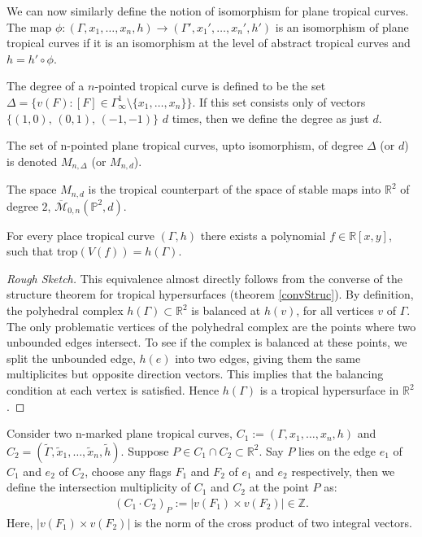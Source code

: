 We can now similarly define the notion of isomorphism for plane tropical curves. 
The map $\phi: (\Gamma, x_{1}, \dots, x_{n}, h) \to (\Gamma', x_{1}', \dots, x_{n}', h')$ is an isomorphism of plane tropical curves if it is an isomorphism at the level of abstract tropical curves and $h = h' \circ \phi$.

\begin{definition}
    The degree of a $n$-pointed tropical curve is defined to be the set $\Delta = \{v(F):[F] \in \Gamma^{1}_{\infty} \setminus \{x_{1}, \dots,x_{n} \} \}$.
    If this set consists only of vectors $\{(1,0),\,(0,1),\,(-1,-1)\}$ $d$ times, then we define the degree as just $d$.
    \par The set of n-pointed plane tropical curves, upto isomorphism, of degree $\Delta$ (or $d$) is denoted $M_{n, \Delta}$ (or $M_{n,d}$).
\end{definition}

The space $M_{n,d}$ is the tropical counterpart of the space of stable maps into $\mathbb{R}^{2}$ of degree $2$, $\overline{\mathcal{M}}_{0,n}(\mathbb{P}^{2},d)$.

\begin{proposition}
    For every place tropical curve $(\Gamma,h)$ there exists a polynomial $f \in \mathbb{R}[x,y]$, such that $\text{trop}(V(f)) = h (\Gamma)$.
\end{proposition}
\begin{proof}[Rough Sketch]
    This equivalence almost directly follows from the converse of the structure theorem for tropical hypersurfaces (theorem \ref{convStruc}). 
    By definition, the polyhedral complex $h(\Gamma)\subset \mathbb{R}^{2}$ is balanced at $h(v)$, for all vertices $v$ of $\Gamma$.
    The only problematic vertices of the polyhedral complex are the points where two unbounded edges intersect.
    To see if the complex is balanced at these points, we split the unbounded edge, $h(e)$ into two edges, giving them the same multiplicites but opposite direction vectors. 
    This implies that the balancing condition at each vertex is satisfied. 
    Hence $h(\Gamma)$ is a tropical hypersurface in $\mathbb{R}^{2}$.
\end{proof}

\begin{definition}
    Consider two n-marked plane tropical curves, $C_{1}:=(\Gamma, x_{1}, \dots, x_{n}, h)$ and $C_{2} = (\tilde\Gamma, \tilde{x}_{1}, \dots, \tilde{x}_{n}, \tilde h)$.
    Suppose $P \in C_{1} \cap C_{2} \subset \mathbb{R}^{2}$. 
    Say $P$ lies on the edge $e_{1}$ of $C_{1}$ and $e_{2}$ of $C_{2}$, choose any flags $F_{1}$ and $F_{2}$ of $e_{1}$ and $e_{2}$ respectively, then we define the intersection multiplicity of $C_{1}$ and $C_{2}$ at the point $P$ as:
    \begin{align*}
        (C_{1}\cdot C_{2})_{P} :=  |v(F_{1}) \times v(F_{2})| \in \mathbb{Z}.
    \end{align*}
    Here, $|v(F_{1}) \times v(F_{2})|$ is the norm of the cross product of two integral vectors.
\end{definition}

